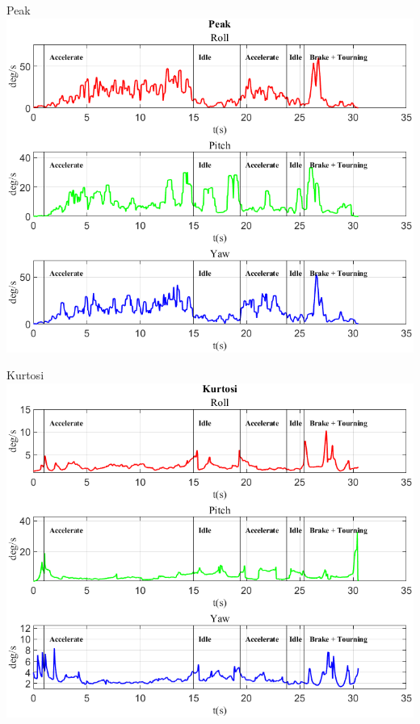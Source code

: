 \documentclass[beamer]{standalone}
\begin{document}
	\begin{frame}{{Peak}}
		\centering\includegraphics[height=.8\textheight]{figure/VAng/Peak}
	\end{frame}
	
	\begin{frame}{{Kurtosi}}
		\centering\includegraphics[height=.8\textheight]{figure/VAng/Kurtosi}
	\end{frame}
	
\end{document}
